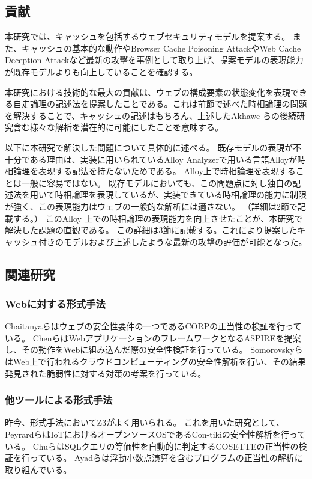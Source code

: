 \documentclass[journal]{IEEEtran}
\begin{document}
\subsection{貢献}
本研究では、キャッシュを包括するウェブセキュリティモデルを提案する。
また、キャッシュの基本的な動作やBrowser Cache Poisoning Attack\cite{bcpattack}やWeb Cache Deception Attack\cite{WCD}など最新の攻撃を事例として取り上げ、提案モデルの表現能力が既存モデルよりも向上していることを確認する。

本研究における技術的な最大の貢献は、ウェブの構成要素の状態変化を表現できる自走論理の記述法を提案したことである。これは前節で述べた時相論理の問題を解決することで、キャッシュの記述はもちろん、上述したAkhawe らの後続研究含む様々な解析を潜在的に可能にしたことを意味する。

以下に本研究で解決した問題について具体的に述べる。
既存モデルの表現が不十分である理由は、実装に用いられているAlloy Analyzerで用いる言語Alloyが時相論理を表現する記法を持たないためである。
Alloy上で時相論理を表現することは一般に容易ではない。
既存モデル\cite{based-model, cookie-model}においても、この問題点に対し独自の記述法を用いて時相論理を表現しているが、実装できている時相論理の能力に制限が強く、この表現能力はウェブの一般的な解析には適さない。
（詳細は2節で記載する。）
このAlloy 上での時相論理の表現能力を向上させたことが、本研究で解決した課題の直観である。
この詳細は3節に記載する。これにより提案したキャッシュ付きのモデルおよび上述したような最新の攻撃の評価が可能となった。

\subsection{関連研究}
\subsubsection{Webに対する形式手法}

Chaitanyaら\cite{chaitanya2017formal}はウェブの安全性要件の一つであるCORPの正当性の検証を行っている。
Chenら\cite{chen2015aspire}はWebアプリケーションのフレームワークとなるASPIREを提案し、その動作をWebに組み込んだ際の安全性検証を行っている。
Somorovskyら\cite{somorovsky2011all}はWeb上で行われるクラウドコンピューティングの安全性解析を行い、その結果発見された脆弱性に対する対策の考案を行っている。

\subsubsection{他ツールによる形式手法}
昨今、形式手法においてZ3\cite{Z3}がよく用いられる。
これを用いた研究として、Peyrardら\cite{peyrard2018towards}はIoTにおけるオープンソースOSであるCon-tikiの安全性解析を行っている。
Chuら\cite{chu2017cosette}はSQLクエリの等価性を自動的に判定するCOSETTEの正当性の検証を行っている。
Ayadら\cite{ayad2010multi-prover}は浮動小数点演算を含むプログラムの正当性の解析に取り組んでいる。
\end{document}
